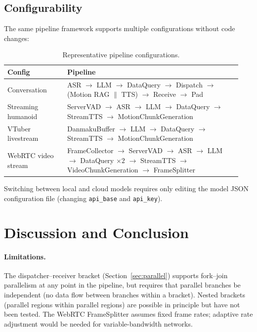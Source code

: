 \documentclass[11pt,a4paper]{article}
\begin{document}
\subsection{Configurability}

The same pipeline framework supports multiple configurations without code changes:

\begin{table}[h]
    \centering
    \small
    \caption{Representative pipeline configurations.}
    \label{tab:configs}
    \begin{tabular}{@{}p{0.24\linewidth}p{0.70\linewidth}@{}}
        \toprule
        \textbf{Config} & \textbf{Pipeline} \\
        \midrule
        Conversation & ASR $\rightarrow$ LLM $\rightarrow$ DataQuery $\rightarrow$ Dispatch $\rightarrow$ (Motion RAG $\|$ TTS) $\rightarrow$ Receive $\rightarrow$ Pad \\
        Streaming humanoid & ServerVAD $\rightarrow$ ASR $\rightarrow$ LLM $\rightarrow$ DataQuery $\rightarrow$ StreamTTS $\rightarrow$ MotionChunkGeneration \\
        VTuber livestream & DanmakuBuffer $\rightarrow$ LLM $\rightarrow$ DataQuery $\rightarrow$ StreamTTS $\rightarrow$ MotionChunkGeneration \\
        WebRTC video stream & FrameCollector $\rightarrow$ ServerVAD $\rightarrow$ ASR $\rightarrow$ LLM $\rightarrow$ DataQuery $\times 2$ $\rightarrow$ StreamTTS $\rightarrow$ VideoChunkGeneration $\rightarrow$ FrameSplitter \\
        \bottomrule
    \end{tabular}
\end{table}

Switching between local and cloud models requires only editing the model JSON configuration file (changing \texttt{api\_base} and \texttt{api\_key}).

\section{Discussion and Conclusion}
\label{sec:discussion}

\paragraph{Limitations.}
The dispatcher--receiver bracket (Section~\ref{sec:parallel}) supports fork--join parallelism at any point in the pipeline, but requires that parallel branches be independent (no data flow between branches within a bracket). Nested brackets (parallel regions within parallel regions) are possible in principle but have not been tested. The WebRTC FrameSplitter assumes fixed frame rates; adaptive rate adjustment would be needed for variable-bandwidth networks.
\end{document}
